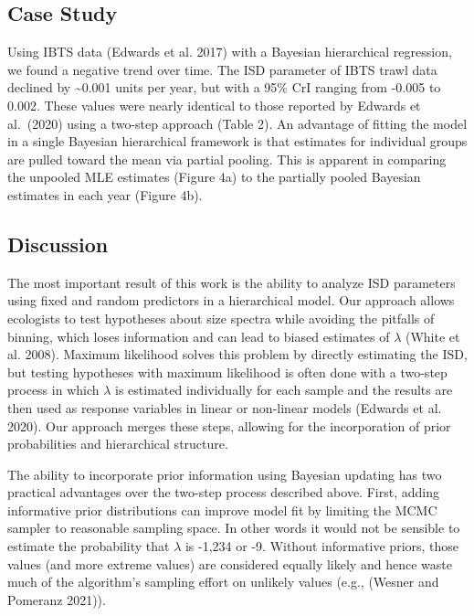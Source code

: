 \documentclass[
  12pt,
]{article}
\numberwithin{equation}
\begin{document}
\hypertarget{case-study}{%
\subsection{Case Study}\label{case-study}}

Using IBTS data (Edwards et al. 2017) with a Bayesian hierarchical
regression, we found a negative trend over time. The ISD parameter of
IBTS trawl data declined by \textasciitilde0.001 units per year, but
with a 95\% CrI ranging from -0.005 to 0.002. These values were nearly
identical to those reported by Edwards et al.~(2020) using a two-step
approach (Table 2). An advantage of fitting the model in a single
Bayesian hierarchical framework is that estimates for individual groups
are pulled toward the mean via partial pooling. This is apparent in
comparing the unpooled MLE estimates (Figure 4a) to the partially pooled
Bayesian estimates in each year (Figure 4b).

\hypertarget{discussion}{%
\subsection{Discussion}\label{discussion}}

The most important result of this work is the ability to analyze ISD
parameters using fixed and random predictors in a hierarchical model.
Our approach allows ecologists to test hypotheses about size spectra
while avoiding the pitfalls of binning, which loses information and can
lead to biased estimates of \(\lambda\) (White et al. 2008). Maximum
likelihood solves this problem by directly estimating the ISD, but
testing hypotheses with maximum likelihood is often done with a two-step
process in which \(\lambda\) is estimated individually for each sample
and the results are then used as response variables in linear or
non-linear models (Edwards et al. 2020). Our approach merges these
steps, allowing for the incorporation of prior probabilities and
hierarchical structure.

The ability to incorporate prior information using Bayesian updating has
two practical advantages over the two-step process described above.
First, adding informative prior distributions can improve model fit by
limiting the MCMC sampler to reasonable sampling space. In other words
it would not be sensible to estimate the probability that \(\lambda\) is
-1,234 or -9. Without informative priors, those values (and more extreme
values) are considered equally likely and hence waste much of the
algorithm's sampling effort on unlikely values (e.g., (Wesner and
Pomeranz 2021)).
\end{document}

